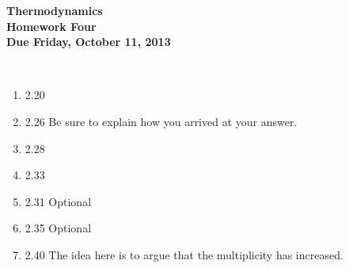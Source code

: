 \documentclass[12pt]{article}
\begin{document}
\pagestyle{empty}
 
\begin{center}
{\large {\bf Thermodynamics}}\\
\medskip
{\large {\bf Homework Four}}\\
\medskip
{ {\bf Due Friday, October 11, 2013}}\\
\end{center}

\hspace{2mm}\\
\noindent 

\begin{enumerate}
\setlength{\itemsep}{1mm}
  \item 2.20
  \item 2.26 Be sure to explain how you arrived at your answer.
  \item 2.28
  \item 2.33
  \item 2.31 Optional
  \item 2.35 Optional
  \item 2.40 The idea here is to argue that the multiplicity has
    increased. 
\end{enumerate}
\end{document}
